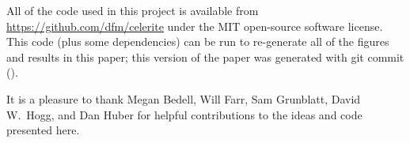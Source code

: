 \documentclass[manuscript, letterpaper]{aastex6}
\begin{document}
%
%

\vspace{1.5em}
All of the code used in this project is available from
\url{https://github.com/dfm/celerite} under the MIT open-source software
license.
This code (plus some dependencies) can be run to re-generate all of the
figures and results in this paper; this version of the paper was generated
with git commit \texttt{\githash} (\gitdate).

\acknowledgments
It is a pleasure to thank
Megan Bedell,
Will Farr,
Sam Grunblatt,
David W.\ Hogg, and
Dan Huber
for helpful contributions to the ideas and code presented here.
\end{document}
